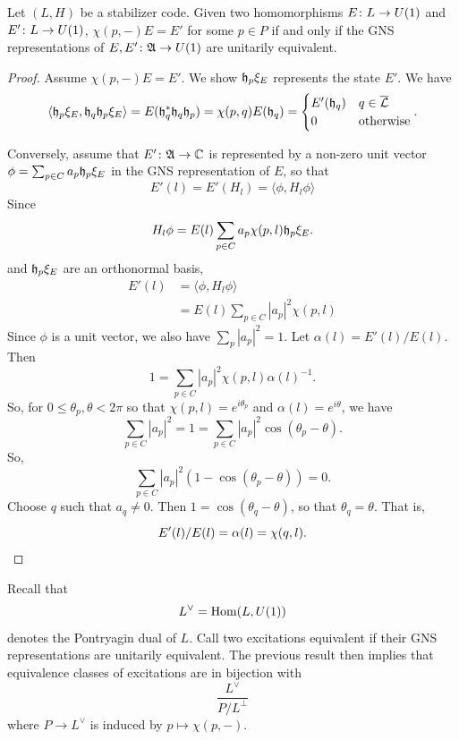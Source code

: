 \documentclass[11pt]{amsart}
\begin{document}
 \begin{prop}\label{prop:superselection}
 Let $(L,H)$ be a stabilizer code.
Given two homomorphisms $E \colon L \to U(1)$ and $E' \colon L \to U(1)$, $\chi(p,-)E=E'$ for some $p\in P$ if and only if the GNS representations of $E,E' \colon \mathfrak{A} \to U(1)$ are unitarily equivalent.
 \end{prop}
 \begin{proof}
 Assume $\chi(p,-)E=E'$. We show $\mathfrak{h}_p \xi_E$ represents the state $E'$. We have
 \[ \langle \mathfrak{h}_p\xi_E, \mathfrak{h}_q\mathfrak{h}_p\xi_E \rangle = E(\mathfrak{h}_q^*\mathfrak{h}_q\mathfrak{h}_p) = \chi(p,q)E(\mathfrak{h}_q) = \begin{cases}  E'(\mathfrak{h}_q) & q\in \overline{\mathcal{L}} \\
 0 & \text{otherwise}
 \end{cases}. \]

Conversely, assume that $E' \colon \mathfrak{A} \to \mathbb{C}$ is represented by a non-zero unit vector $\phi = \sum_{p \in C}a_p \mathfrak{h}_p \xi_E $  in the GNS representation of $E$,
so that
\[ E'(l)= E'(H_l) =\langle  \phi, H_l \phi \rangle\]
Since
\[H_l\phi = E(l) \sum_{p \in C}a_p\chi(p,l)\mathfrak{h}_p\xi_E.\]
and  $\mathfrak{h}_p\xi_E$ are an orthonormal basis,
\begin{align*}
E'(l) &= \langle \phi,H_l \phi \rangle \\
&=E(l) \sum_{p\in C} |a_p|^2\chi(p,l)
\end{align*}
Since $\phi$ is a unit vector, we also have $\sum_{p}|a_p|^2=1$. Let $\alpha(l) =E'(l)/E(l)$. Then
\[ 1 = \sum_{p\in C} |a_p|^2\chi(p,l) \alpha(l)^{-1}.\]
So, for $0\leq \theta_p,\theta<2\pi$ so that $\chi(p,l)  =e^{i \theta_p}$ and $\alpha(l) =e^{i\theta}$, we have
\[  \sum_{p\in C}|a_p|^2 = 1 = \sum_{p\in C}|a_p|^2 \cos(\theta_p-\theta).\]
So,
\[  \sum_{p\in C}|a_p|^2(1- \cos(\theta_p-\theta)) =0.\]
Choose $q$ such that $a_q\neq 0$. Then $1= \cos(\theta_q-\theta)$, so that $\theta_q = \theta$. That is,
\[ E'(l)/E(l) =\alpha(l)= \chi(q,l). \qedhere\]
 \end{proof}



\begin{rem}
Recall that
\[ L^\vee = \operatorname{Hom}(L,U(1))\]
denotes the Pontryagin dual of $L$.  Call two excitations equivalent if their GNS representations are unitarily equivalent. The previous result then implies that equivalence classes of excitations are in bijection with
\[ \frac{ L^\vee}{P/L^\perp}\]
where $P \to L^\vee$ is induced by $p\mapsto \chi(p,-)$.
\end{rem}
\end{document}
